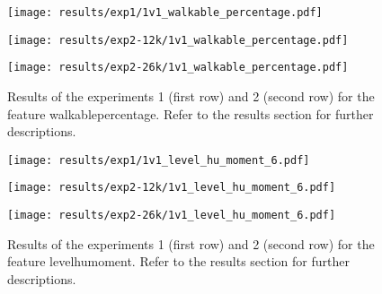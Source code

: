  
\begin{figure}[h!]
    \centering
	\begin{minipage}{0.3\linewidth}
		\texttt{[image: results/exp1/1v1\_walkable\_percentage.pdf]}
	\end{minipage}

	\begin{minipage}{0.3\linewidth}
		\texttt{[image: results/exp2-12k/1v1\_walkable\_percentage.pdf]}
	\end{minipage}
	\begin{minipage}{0.3\linewidth}
		\texttt{[image: results/exp2-26k/1v1\_walkable\_percentage.pdf]}
	\end{minipage}

	\caption[ Results: Feature walkable\textunderscore percentage]{ Results of the experiments 1 (first row) and 2 (second row) for the feature walkable\textunderscore percentage. Refer to the results section for further descriptions. }
	\label{fig:appendix_walkable_percentage}
\end{figure}
 
\begin{figure}[h!]
    \centering
	\begin{minipage}{0.3\linewidth}
		\texttt{[image: results/exp1/1v1\_level\_hu\_moment\_6.pdf]}
	\end{minipage}

	\begin{minipage}{0.3\linewidth}
		\texttt{[image: results/exp2-12k/1v1\_level\_hu\_moment\_6.pdf]}
	\end{minipage}
	\begin{minipage}{0.3\linewidth}
		\texttt{[image: results/exp2-26k/1v1\_level\_hu\_moment\_6.pdf]}
	\end{minipage}

	\caption[ Results: Feature level\textunderscore hu\textunderscore moment]{ Results of the experiments 1 (first row) and 2 (second row) for the feature level\textunderscore hu\textunderscore moment. Refer to the results section for further descriptions. }
	\label{fig:appendix_level_hu_moment_6}
\end{figure}
 \newpage 

